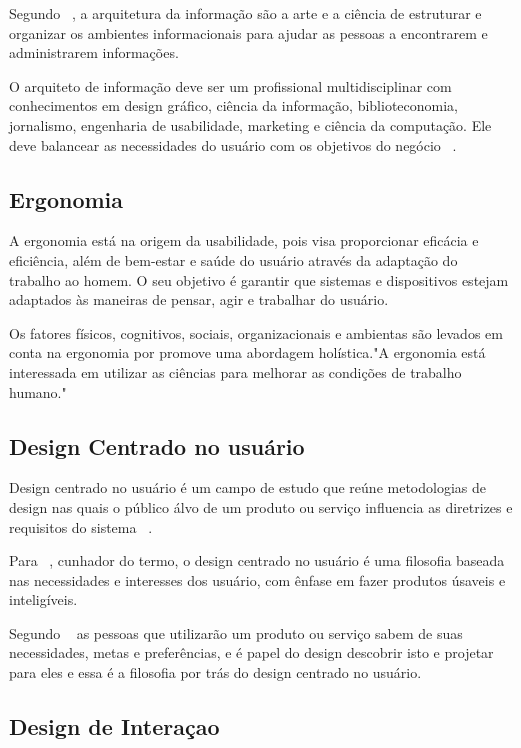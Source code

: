 Segundo ~, a arquitetura da informação são a arte e a ciência de estruturar e organizar os ambientes informacionais para ajudar as pessoas a encontrarem e administrarem informações.

O arquiteto de informação deve ser um profissional multidisciplinar com conhecimentos em design gráfico, ciência da informação, biblioteconomia, jornalismo, engenharia de usabilidade, marketing e ciência da computação. Ele deve balancear as necessidades do usuário com os objetivos do negócio ~\cite{rosenfeld1998}.

\subsection{Ergonomia}

A ergonomia está na origem da usabilidade, pois visa proporcionar eficácia e eficiência, além de bem-estar e saúde do usuário através da adaptação do trabalho ao homem. O seu objetivo é garantir que sistemas e dispositivos estejam adaptados às maneiras de pensar, agir e trabalhar do usuário. ~\cite{cybis2010}

	Os fatores físicos, cognitivos, sociais, organizacionais e ambientas são levados em conta na ergonomia por promove uma abordagem holística."A ergonomia está interessada em utilizar as ciências para melhorar as condições de trabalho humano."    

\subsection{Design Centrado no usuário}

	Design centrado no usuário é um campo de estudo que reúne metodologias de design nas quais o público álvo de um produto ou serviço influencia as diretrizes e requisitos do sistema ~\cite{norman2006design}.
	
	Para ~, cunhador do termo, o design centrado no usuário é uma filosofia baseada nas necessidades e interesses dos usuário, com ênfase em fazer produtos úsaveis e inteligíveis. 

	Segundo ~ as pessoas que utilizarão um produto ou serviço sabem de suas necessidades, metas e preferências, e é papel do design descobrir isto e projetar para eles e essa é a filosofia por trás do design centrado no usuário.

\subsection{Design de Interaçao}

